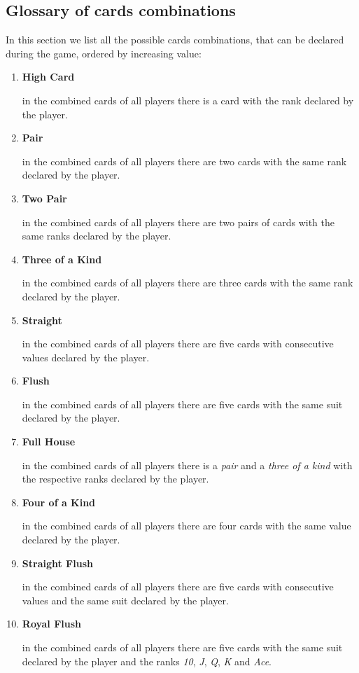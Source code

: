 \documentclass{scrartcl}
\begin{document}
\subsection{Glossary of cards combinations}\label{cards-combinations}
In this section we list all the possible cards combinations, that can be declared during the game,
ordered by increasing value:
\begin{enumerate}
      \item \textbf{High Card}\par
            in the combined cards of all players there is a card with the rank declared by the player.
      \item \textbf{Pair}\par
            in the combined cards of all players there are two cards with the same rank declared by
            the player.
      \item \textbf{Two Pair}\par
            in the combined cards of all players there are two pairs of cards with the same ranks
            declared by the player.
      \item \textbf{Three of a Kind}\par
            in the combined cards of all players there are three cards with the same rank declared by
            the player.
      \item \textbf{Straight}\par
            in the combined cards of all players there are five cards with consecutive values declared
            by the player.
      \item \textbf{Flush}\par
            in the combined cards of all players there are five cards with the same suit declared by
            the player.
      \item \textbf{Full House}\par
            in the combined cards of all players there is a \emph{pair} and a \emph{three of a kind}
            with the respective ranks declared by the player.
      \item \textbf{Four of a Kind}\par
            in the combined cards of all players there are four cards with the same value declared
            by the player.
      \item \textbf{Straight Flush}\par
            in the combined cards of all players there are five cards with consecutive values and
            the same suit declared by the player.
      \item \textbf{Royal Flush}\par
            in the combined cards of all players there are five cards with the same suit declared
            by the player and the ranks \emph{10}, \emph{J}, \emph{Q}, \emph{K} and \emph{Ace}.
\end{enumerate}
\end{document}
